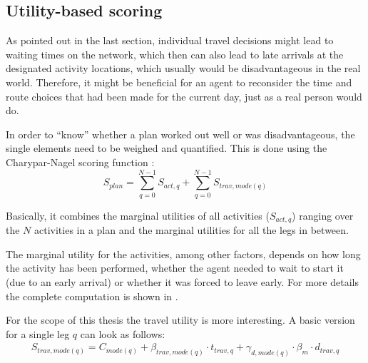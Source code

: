 \subsection{Utility-based scoring}

As pointed out in the last section, individual travel decisions might lead to
waiting times on the network, which then can also lead to late arrivals at the
designated activity locations, which usually would be disadvantageous in the real
world. Therefore, it might be beneficial for an agent to reconsider the time and
route choices that had been made for the current day, just as a real person
would do.

In order to ``know'' whether a plan worked out well or was disadvantageous, the
single elements need to be weighed and quantified. This is done using the Charypar-Nagel
scoring function \citep{Horni2015}:
\begin{equation}
S_{plan} = \sum_{q=0}^{N-1} S_{act,q} + \sum_{q=0}^{N-1} S_{trav,mode(q)}
\end{equation}

Basically, it combines the marginal utilities of all activities ($S_{act,q}$) ranging
over the $N$ activities in a plan and the marginal utilities for all the legs in
between.

The marginal utility for the activities, among other factors, depends on how long
the activity has been performed, whether the agent needed to wait to start it (due
to an early arrival) or whether it was forced to leave early. For more details
the complete computation is shown in \citep{Horni2015}.

For the scope of this thesis the travel utility is more interesting. A basic version
for a single leg $q$ can look as follows:
\begin{equation}\begin{aligned}
S_{trav,mode(q)} = C_{mode(q)} + \beta_{trav,mode(q)} \cdot t_{trav,q} + \gamma_{d,mode(q)} \cdot \beta_{m} \cdot d_{trav,q}
\end{aligned}\end{equation}

